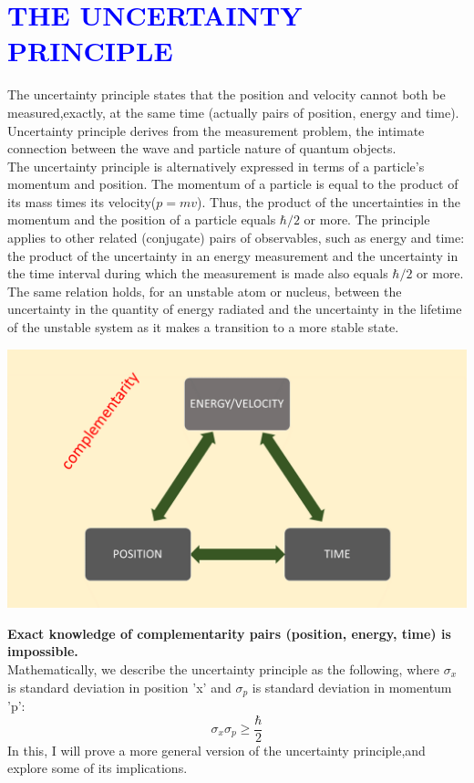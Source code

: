 \chapter{\textcolor{blue}{THE UNCERTAINTY PRINCIPLE}}
  \hspace*{1cm} The uncertainty principle states that the position and velocity cannot both be measured,exactly, at the same time (actually pairs of position, energy and time).\\
\hspace*{1cm}Uncertainty principle derives from the measurement problem, the intimate connection between the wave and particle nature of quantum objects.\\
 \hspace*{1cm}The uncertainty principle is alternatively expressed in terms of a particle's momentum and position. The momentum of a particle is equal to the product of its mass times its velocity($p=mv$). Thus, the product of the uncertainties in the momentum and the position of a particle equals $\hbar/2$ or more. The principle applies to other related (conjugate) pairs of observables, such as energy and time: the product of the uncertainty in an energy measurement and the uncertainty in the time interval during which the measurement is made also equals $\hbar/2$ or more. The same relation holds, for an unstable atom or nucleus, between the uncertainty in the quantity of energy radiated and the uncertainty in the lifetime of the unstable system as it makes a transition to a more stable state.
 \begin{center}
\includegraphics[height=.2\textheight,width=.8\textwidth]{complementarity}
\end{center}
\textbf{Exact knowledge of complementarity pairs (position, energy, time) is impossible.}\\
Mathematically, we describe the uncertainty principle as the following, where ${\sigma}_{x}$ is standard deviation in position 'x' and ${\sigma}_{p}$ is standard deviation in momentum 'p':
$${\sigma}_{x}{\sigma}_{p}\geq \frac{\hbar}{2}$$
In this, I will prove a more general version of the uncertainty principle,and explore some of its implications.
\newpage
